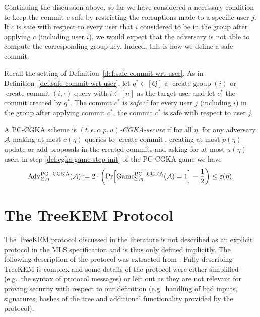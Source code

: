 Continuing the discussion above, so far we have considered a necessary condition to keep the commit $c$ safe by restricting the corruptions made to a specific user $j$. If $c$ is safe with respect to every user that $i$ considered to be in the group after applying $c$ (including user $i$), we would expect that the adversary is not able to compute the corresponding group key. Indeed, this is how we define a safe commit.

\begin{definition} \label{def:safe-commit}
	Recall the setting of Definition~\ref{def:safe-commit-wrt-user}. As in Definition~\ref{def:safe-commit-wrt-user}, let $q^* \in [Q]$ a $\operatorname{create-group}(i)$ or $\operatorname{create-commit}(i, \cdot)$ query with $i \in [n]$ as the target user and let $c^*$ the commit created by $q^*$. The commit $c^*$ is \emph{safe} if for every user $j$ (including $i$) in the group after applying commit $c^*$, the commit $c^*$ is safe with respect to user $j$.
\end{definition}


\begin{definition}
	A PC-CGKA scheme is \emph{$(t, \epsilon, c, p, u)$-CGKA-secure} if for all $\eta$, for any adversary $\mathcal{A}$ making at most $c(\eta)$ queries to $\operatorname{create-commit}$, creating at most $p(\eta)$ update or add proposals in the created commits and asking for at most $u(\eta)$ users in step \ref{def:cgka-game-step-init} of the PC-CGKA game we have
	\begin{align*}
		\advantage{\Sigma}{\eta}{PC-CGKA}(\adv) \coloneqq 2 \cdot \left(\pr{\game{\Sigma}{\eta}{PC-CGKA}(\adv) = 1} - \frac{1}{2}\right) \le \epsilon(\eta).
	\end{align*}
\end{definition}

\section{The TreeKEM Protocol}


The TreeKEM protocol discussed in the literature is not described as an explicit protocol in the MLS specification \cite{rfc9420} and is thus only defined implicitly. The following description of the protocol was extracted from \cite{rfc9420}. Fully describing TreeKEM is complex and some details of the protocol were either simplified (e.g.\ the syntax of protocol messages) or left out as they are not relevant for proving security with respect to our definition (e.g.\ handling of bad inputs, signatures, hashes of the tree and additional functionality provided by the protocol).

